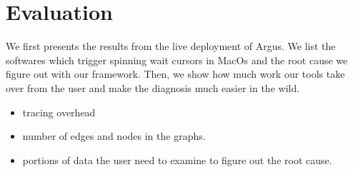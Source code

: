 \section{Evaluation}
We first presents the results from the live deployment of Argus.
We list the softwares which trigger spinning wait cursors in MacOs and the root cause we figure out with our framework.
Then, we show how much work our tools take over from the user and make the diagnosis much easier in the wild.

\begin{itemize}
\item tracing overhead
\item number of edges and nodes in the graphs.
\item portions of data the user need to examine to figure out the root cause.
\end{itemize}
